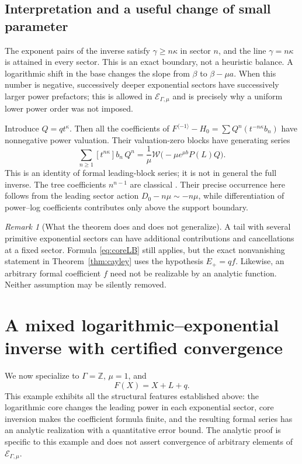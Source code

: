 \documentclass[11pt,a4paper]{article}
\theoremstyle{definition}
\theoremstyle{remark}
\newtheorem{remark}[theorem]{Remark}
\newcommand{\Z}{\mathbb Z}
\newcommand{\E}{\mathcal E_{\Gamma,\mu}}
\newcommand{\rev}{^{\langle-1\rangle}}
\begin{document}
\subsection{Interpretation and a useful change of small parameter}
The exponent pairs of the inverse satisfy $\gamma\ge n\kappa$ in sector
$n$, and the line $\gamma=n\kappa$ is attained in every sector. This is an
exact boundary, not a heuristic balance. A logarithmic shift in the base
changes the slope from $\beta$ to $\beta-\mu a$. When this number is
negative, successively deeper exponential sectors have successively larger
power prefactors; this is allowed in $\E$ and is precisely why a uniform
lower power order was not imposed.

Introduce $Q=qt^\kappa$. Then all the coefficients of
$F\rev-H_0=\sum Q^n(t^{-n\kappa}b_n)$ have nonnegative power valuation.
Their valuation-zero blocks have generating series
\begin{equation}\label{eq:gradedW}
 \sum_{n\ge1}[t^{n\kappa}]b_n\,Q^n
 =\frac1\mu\mathcal W\bigl(-\mu e^{\mu b}P(L)Q\bigr).
\end{equation}
This is an identity of formal leading-block series; it is not in general
the full inverse. The tree coefficients $n^{n-1}$ are classical
\cite{Gessel}. Their precise occurrence here follows from the leading
sector action $D_0-n\mu\sim-n\mu$, while differentiation of power--log
coefficients contributes only above the support boundary.

\begin{remark}[What the theorem does and does not generalize]
A tail with several primitive exponential sectors can have additional
contributions and cancellations at a fixed sector. Formula
\eqref{eq:coreLB} still applies, but the exact nonvanishing statement in
Theorem~\ref{thm:cayley} uses the hypothesis $E_+=qf$. Likewise, an arbitrary
formal coefficient $f$ need not be realizable by an analytic function.
Neither assumption may be silently removed.
\end{remark}

\section{A mixed logarithmic--exponential inverse with certified convergence}
\label{sec:mixed}

We now specialize to $\Gamma=\Z$, $\mu=1$, and
\begin{equation}\label{eq:mixedF}
 F(X)=X+L+q.
\end{equation}
This example exhibits all the structural features established above: the
logarithmic core changes the leading power in each exponential sector,
core inversion makes the coefficient formula finite, and the resulting
formal series has an analytic realization with a quantitative error bound.
The analytic proof is specific to this example and does not assert
convergence of arbitrary elements of $\E$.
\end{document}
